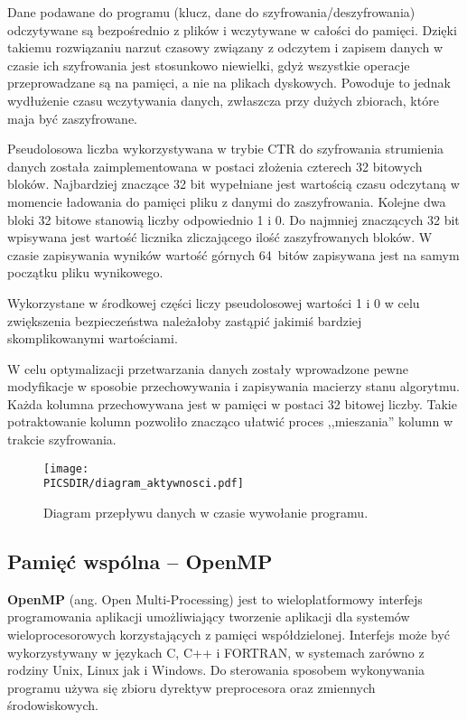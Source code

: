 \documentclass[a4paper,12pt]{article}
\def\PICSDIR{PICS}
\begin{document}
Dane podawane do programu (klucz, dane do szyfrowania/deszyfrowania) odczytywane są bezpośrednio z plików i wczytywane w całości do pamięci. Dzięki takiemu rozwiązaniu narzut czasowy związany z odczytem i zapisem danych w czasie ich szyfrowania jest stosunkowo niewielki, gdyż wszystkie operacje przeprowadzane są na pamięci, a nie na plikach dyskowych. Powoduje to jednak wydłużenie czasu wczytywania danych, zwłaszcza przy dużych zbiorach, które maja być zaszyfrowane.

Pseudolosowa liczba wykorzystywana w trybie CTR do szyfrowania strumienia danych została zaimplementowana w postaci złożenia czterech 32 bitowych bloków. Najbardziej znaczące 32 bit wypełniane jest wartością czasu odczytaną w momencie ładowania do pamięci pliku z danymi do zaszyfrowania. Kolejne dwa bloki 32 bitowe stanowią liczby odpowiednio 1 i 0. Do najmniej znaczących 32 bit wpisywana jest wartość licznika zliczającego ilość zaszyfrowanych bloków. W czasie zapisywania wyników wartość górnych 64~bitów zapisywana jest na samym początku pliku wynikowego.

Wykorzystane w środkowej części liczy pseudolosowej wartości 1 i 0 w celu zwiększenia bezpieczeństwa należałoby zastąpić jakimiś bardziej skomplikowanymi wartościami.

W celu optymalizacji przetwarzania danych zostały wprowadzone pewne modyfikacje w sposobie przechowywania i zapisywania macierzy stanu algorytmu. Każda kolumna przechowywana jest w pamięci w postaci 32 bitowej liczby. Takie potraktowanie kolumn pozwoliło znacząco ułatwić proces ,,mieszania'' kolumn w trakcie szyfrowania.

\begin{figure}
\centering
\texttt{[image: \\PICSDIR/diagram\_aktywnosci.pdf]}
\caption{Diagram przepływu danych w czasie wywołanie programu.}
\label{rys:da}
\end{figure}

\subsection{Pamięć wspólna -- OpenMP}
\textbf{OpenMP} (ang. Open Multi-Processing)  jest to wieloplatformowy interfejs programowania aplikacji umożliwiający tworzenie aplikacji dla systemów wieloprocesorowych korzystających z pamięci współdzielonej. Interfejs może być wykorzystywany w językach C, C++ i FORTRAN, w systemach zarówno z rodziny Unix, Linux jak i Windows. Do sterowania sposobem wykonywania programu używa się zbioru dyrektyw preprocesora oraz zmiennych środowiskowych.
\end{document}
